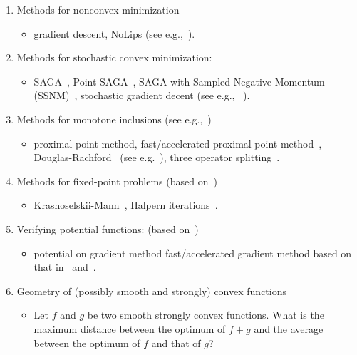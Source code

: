 \documentclass[11pt,a4paper]{article}
\begin{document}
\begin{enumerate}
\begin{itemize}
						\end{itemize}
						\item Methods for nonconvex minimization
						\begin{itemize}
							\item gradient descent, NoLips (see e.g.,~\cite{bolte2018first}).
						\end{itemize}
						\item Methods for stochastic convex minimization:
						\begin{itemize}
							\item SAGA~\cite{defazio2014saga}, Point SAGA~\cite{defazio2016simple}, SAGA with Sampled Negative Momentum (SSNM)~\cite{pmlr-v89-zhou19c}, stochastic gradient decent (see e.g.,~ \cite{moulines2011non}).
						\end{itemize}
						\item Methods for monotone inclusions (see e.g.,~\cite{bauschke2011convex,ryu2016primer})
						\begin{itemize}
							\item proximal point method, fast/accelerated proximal point method~\cite{kim2019accelerated}, Douglas-Rachford~\cite{douglas1956,moursi2019douglas} (see e.g.~\cite{bauschke2017douglas}), three operator splitting~\cite{davis2017three}.
						\end{itemize}
						\item Methods for fixed-point problems (based on~\cite{lieder2017convergence,lieder2018})
						\begin{itemize}
							\item Krasnoselskii-Mann~\cite{mann1953mean}, Halpern iterations~\cite{halpern1967fixed}.
						\end{itemize}
						\item Verifying potential functions: (based on~\cite{pmlr-v99-taylor19a})
						\begin{itemize}
							\item potential on gradient method fast/accelerated gradient method based on that in~\cite{bansal2017potential} and~\cite{pmlr-v99-taylor19a}.
						\end{itemize}
						\item Geometry of (possibly smooth and strongly) convex functions
						\begin{itemize}
							\item Let $f$ and $g$ be two smooth strongly convex functions. What is the maximum distance between the optimum of $f+g$ and the average between the optimum of $f$ and that of $g$?

\end{itemize}
\end{enumerate}
\end{document}
